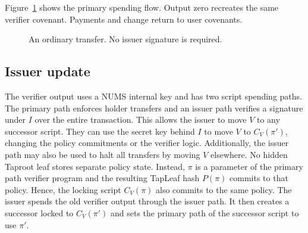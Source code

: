 \documentclass[11pt]{article}
\begin{document}
    Figure~\ref{fig:transfer} shows the primary spending flow.
    Output zero recreates the same verifier covenant.
    Payments and change return to user covenants.

    \begin{figure}[ht]
        \centering
        \caption{An ordinary transfer. No issuer signature is required.}
        \label{fig:transfer}
    \end{figure}

    \subsection{Issuer update}

    The verifier output uses a NUMS internal key and has two script spending paths.
    The primary path enforces holder transfers and an issuer path verifies a signature under $I$ over the entire transaction.
    This allows the issuer to move $V$ to any successor script.
    They can use the secret key behind $I$ to move $V$ to $C_V(\pi')$, changing the policy commitments or the verifier logic.
    Additionally, the issuer path may also be used to halt all transfers by moving $V$ elsewhere.
    No hidden Taproot leaf stores separate policy state.
    Instead, $\pi$ is a parameter of the primary path verifier program and the resulting TapLeaf hash $P(\pi)$ commits to that policy.
    Hence, the locking script $C_V(\pi)$ also commits to the same policy.
    The issuer spends the old verifier output through the issuer path.
    It then creates a successor locked to $C_V(\pi')$ and sets the primary path of the successor script to use $\pi'$.
\end{document}
